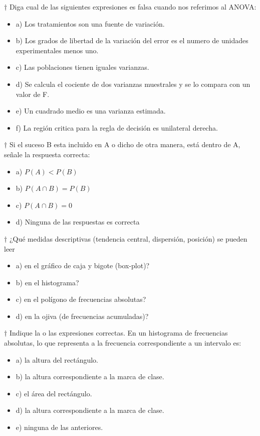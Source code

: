 \documentclass[10pt,a4paper]{article}
\begin{document}
$\dagger$	Diga cual de las siguientes expresiones es falsa cuando nos referimos al ANOVA:
	\begin{itemize}
		\item a) Los tratamientos son una fuente de variación.
		\item b) Los grados de libertad de la variación del error es el numero de unidades experimentales menos uno.
		\item c) Las poblaciones tienen iguales varianzas.
		\item d) Se calcula el cociente de dos varianzas muestrales y se lo compara con un valor de F.
		\item e) Un cuadrado medio es una varianza estimada.
		\item f) La región critica para la regla de decisión es unilateral derecha.
	\end{itemize}

$\dagger$ Si el suceso B esta incluido en A o dicho de otra manera, está dentro de A, señale la respuesta correcta:
\begin{itemize}
	\item a) $P(A)<P(B)$
	\item b) $P(A\cap B) = P(B)$
	\item c) $P(A\cap B) = 0$
	\item d) Ninguna de las respuestas es correcta 
\end{itemize}

$\dagger$ ¿Qué medidas descriptivas (tendencia central, dispersión, posición) se pueden leer
\begin{itemize}
	\item a) en el gráfico de caja y bigote (box-plot)?
	\item b) en el histograma?
	\item c) en el polígono de frecuencias absolutas?
	\item d) en la ojiva (de frecuencias acumuladas)?
\end{itemize}

$\dagger$ Indique la o las expresiones correctas. En un histograma de frecuencias absolutas, lo que representa a la frecuencia correspondiente a un intervalo es:
\begin{itemize}
	\item a) la altura del rectángulo.
	\item b) la altura correspondiente a la marca de clase.
	\item c) el área del rectángulo.
	\item d) la altura correspondiente a la marca de clase.
	\item e) ninguna de las anteriores.
\end{itemize}
\end{document}
